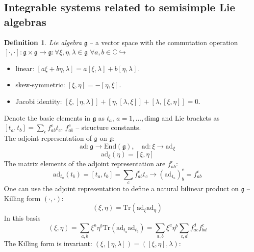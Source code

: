 \documentclass[12pt]{article}
\theoremstyle{definition}
\newtheorem{defin}{Definition}[]
\begin{document}
\subsection*{Integrable systems related to semisimple Lie algebras}
\begin{defin}
    \textit{Lie algebra} $\mathfrak{g}$ -- a vector space with the commutation operation $[\cdot,\cdot]:\mathfrak{g}\times\mathfrak{g}\rightarrow\mathfrak{g}:\forall\xi,\eta,\lambda\in\mathfrak{g}$ $\forall a,b\in\mathbb{C}\hookrightarrow$
    \begin{itemize}
        \item linear: $[a\xi+b\eta,\lambda]=a[\xi,\lambda]+b[\eta,\lambda]$.
        \item skew-symmetric: $[\xi,\eta]=-[\eta,\xi]$.
        \item Jacobi identity: $[\xi,[\eta,\lambda]]+[\eta,[\lambda,\xi]]+[\lambda,[\xi,\eta]]=0$.
    \end{itemize}   
\end{defin}
Denote the basic elements in $\mathfrak{g}$ as $t_a$, $a=1,...,\text{dim}\mathfrak{g}$ and Lie brackets as $[t_a,t_b]=\sum\limits_cf_{ab}^ct_c$, $f_{ab}^c$ -- structure constants.\\
The adjoint representation of $\mathfrak{g}$ on $\mathfrak{g}$:
\begin{equation}
    \text{ad}:\mathfrak{g}\rightarrow\text{End}(\mathfrak{g}),\quad \text{ad}:\xi\rightarrow\text{ad}_\xi
\end{equation}
\begin{equation}
    \text{ad}_\xi(\eta)=[\xi,\eta]
\end{equation}
The matrix elements of the adjoint representation are $f_{ab}^c$:
\begin{equation}
    \text{ad}_{t_a}(t_b)=[t_a,t_b]=\sum\limits_cf_{ab}^ct_c\rightarrow(\text{ad}_{t_a})^c_b=f_{ab}^c
\end{equation}
One can use the adjoint representation to define a natural bilinear product on $\mathfrak{g}$ -- Killing form $(\cdot,\cdot)$:
\begin{equation}
    (\xi,\eta)=\text{Tr}(\text{ad}_\xi\text{ad}_\eta)
\end{equation}
In this basis
\begin{equation}
    (\xi,\eta)=\sum\limits_{a,b}\xi^a\eta^b\text{Tr}(\text{ad}_{t_a}\text{ad}_{t_b})=\sum\limits_{a,b}\xi^a\eta^b\sum\limits_{c,d}f_{ac}^df_{bd}^c
\end{equation}
The Killing form is invariant: $(\xi,[\eta,\lambda])=([\xi,\eta],\lambda)$:
\end{document}
